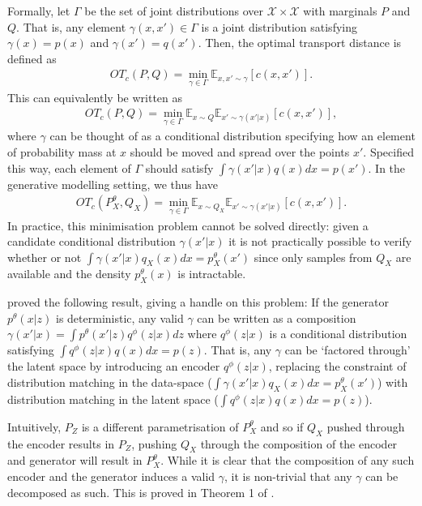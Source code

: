 Formally, let $\Gamma$ be the set of joint distributions over $\mathcal{X} \times \mathcal{X}$ with marginals $P$ and $Q$. 
That is, any element $\gamma(x, x') \in \Gamma$ is a joint distribution satisfying $\gamma(x) = p(x)$ and $\gamma(x') = q(x')$.
Then, the optimal transport distance is defined as
%
\begin{align*}
OT_c(P, Q) = \min_{\gamma \in \Gamma} \mathbb{E}_{x, x' \sim \gamma} \left[ c(x, x') \right].
\end{align*}
%
This can equivalently be written as
%
\begin{align*}
OT_c(P, Q) = \min_{\gamma \in \Gamma} \mathbb{E}_{x\sim Q} \mathbb{E}_{x'\sim \gamma(x'|x)} \left[ c(x, x') \right],
\end{align*}
%
where $\gamma$ can be thought of as a conditional distribution specifying how an element of probability mass at $x$ should be moved and spread over the points $x'$. 
Specified this way, each element of $\Gamma$ should satisfy $\int \gamma(x'|x) q(x) dx = p(x')$.
In the generative modelling setting, we thus have
%
\begin{align*}
OT_c(P_X^\theta, Q_X) = \min_{\gamma \in \Gamma} \mathbb{E}_{x\sim Q_X} \mathbb{E}_{x'\sim \gamma(x'|x)} \left[ c(x, x') \right].
\end{align*}
%
In practice, this minimisation problem cannot be solved directly: given a candidate conditional distribution $\gamma(x'|x)$ it is not practically possible to verify whether or not $\int \gamma(x'|x) q_X(x) dx = p_X^\theta(x')$ since only samples from $Q_X$ are available and the density $p^\theta_X(x)$ is intractable.

\cite{tolstikhin2017wasserstein} proved the following result, giving a handle on this problem:
If the generator $p^\theta(x|z)$ is deterministic, any valid $\gamma$ can be written as a composition $\gamma(x'|x) = \int p^\theta(x'|z) q^\phi(z|x) dz$ where $q^\phi(z|x)$ is a conditional distribution satisfying $\int q^\phi(z|x) q(x) dx = p(z)$. 
That is, any $\gamma$ can be `factored through' the latent space by introducing an encoder $q^\phi(z|x)$, replacing the constraint of distribution matching in the data-space ($\int \gamma(x'|x) q_X(x) dx = p_X^\theta(x')$) with distribution matching in the latent space ($\int q^\phi(z|x) q(x) dx = p(z)$).

Intuitively, $P_Z$ is a different parametrisation of $P_X^\theta$ and so if $Q_X$ pushed through the encoder results in $P_Z$, pushing $Q_X$ through the composition of the encoder and generator will result in $P_X^\theta$. 
While it is clear that the composition of any such encoder and the generator induces a valid $\gamma$, it is non-trivial that any $\gamma$ can be decomposed as such. 
This is proved in Theorem 1 of \cite{tolstikhin2017wasserstein}.

